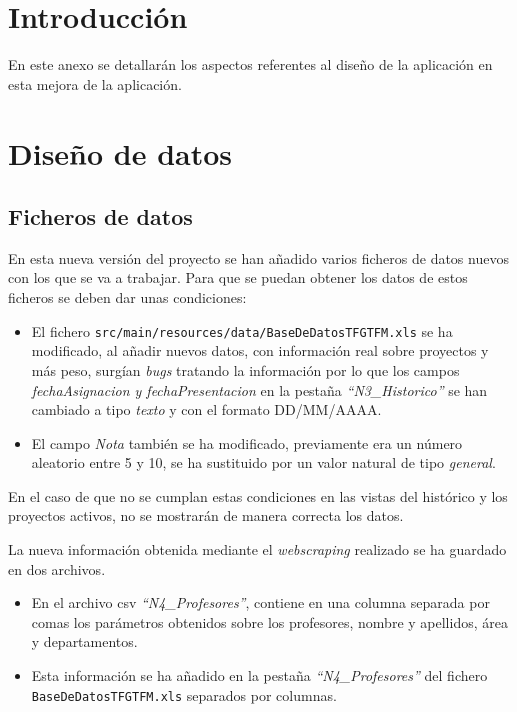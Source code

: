 
\section{Introducción}
En este anexo se detallarán los aspectos referentes al diseño de la aplicación en esta mejora de la aplicación.

\section{Diseño de datos}

\subsection{Ficheros de datos}

En esta nueva versión del proyecto se han añadido varios ficheros de datos nuevos con los que se va a trabajar. Para que se puedan obtener los datos de estos ficheros se deben dar unas condiciones:

\begin{itemize}
	\item El fichero \texttt{src/main/resources/data/BaseDeDatosTFGTFM.xls} se ha modificado, al añadir nuevos datos, con información real sobre proyectos y más peso, surgían \emph{bugs} tratando la información por lo que los campos \emph{fechaAsignacion y fechaPresentacion} en la pestaña \emph{``N3\_Historico''} se han cambiado a tipo \emph{texto} y con el formato DD/MM/AAAA.
	\item El campo \emph{Nota} también se ha modificado, previamente era un número aleatorio entre 5 y 10, se ha sustituido por un valor natural de tipo \emph{general}.
\end{itemize}

En el caso de que no se cumplan estas condiciones en las vistas del histórico
y los proyectos activos, no se mostrarán de manera correcta los datos.

La nueva información obtenida mediante el \emph{webscraping} realizado se ha guardado en dos archivos.
\begin{itemize}
	\item En el archivo csv \emph{``N4\_Profesores''}, contiene en una columna separada por comas los parámetros obtenidos sobre los profesores, nombre y apellidos, área y departamentos.
	\item Esta información se ha añadido en la pestaña \emph{``N4\_Profesores''} del fichero \texttt{BaseDeDatosTFGTFM.xls} separados por columnas.
\end{itemize}

